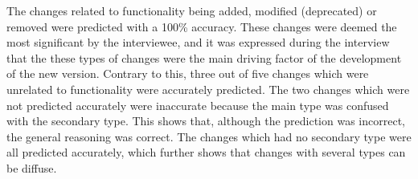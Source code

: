 \documentclass{sig-alternate}
\begin{document}
The changes related to functionality being added, modified (deprecated) or removed were predicted with a 100\% accuracy. These changes were deemed the most significant by the interviewee, and it was expressed during the interview that the these types of changes were the main driving factor of the development of the new version. Contrary to this, three out of five changes which were unrelated to functionality were accurately predicted. The two changes which were not predicted accurately were inaccurate because the main type was confused with the secondary type. This shows that, although the prediction was incorrect, the general reasoning was correct. The changes which had no secondary type were all predicted accurately, which further shows that changes with several types can be diffuse. 
\end{document}
